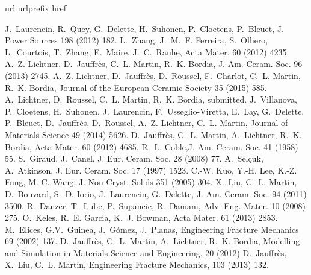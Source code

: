 \documentclass[preprint,12pt,3p]{elsarticle}
\begin{document}
%
\begin{thebibliography}{10}
\expandafter\ifx\csname url\endcsname\relax
  \def\url#1{\texttt{#1}}\fi
\expandafter\ifx\csname urlprefix\endcsname\relax\def\urlprefix{URL }\fi
\expandafter\ifx\csname href\endcsname\relax
  \def\href#1#2{#2} \def\path#1{#1}\fi

J.~Laurencin, R.~Quey, G.~Delette, H.~Suhonen, P.~Cloetens, P.~Bleuet, J. Power Sources
  198 (2012) 182.
L.~Zhang, J.~M.~F. Ferreira, S.~Olhero, L.~Courtois, T.~Zhang, E.~Maire,
  J.~C.~Rauhe,  Acta Mater. 60 (2012) 4235.
A.~Z. Lichtner, D.~Jauffr\`{e}s, C.~L. Martin, R.~K. Bordia, J. Am. Ceram. Soc. 96
  (2013) 2745.
A.~Z. Lichtner, D.~Jauffr\`{e}s, D.~Roussel, F.~Charlot, C.~L. Martin, R.~K.
  Bordia, Journal of the European Ceramic Society 35
  (2015) 585.
A.~Lichtner, D.~Roussel, C.~L. Martin, R.~K. Bordia,  submitted.
J.~Villanova, P.~Cloetens, H.~Suhonen, J.~Laurencin, F.~Usseglio-Viretta,
  E.~Lay, G.~Delette, P.~Bleuet, D.~Jauffr\`{e}s, D.~Roussel, A.~Z. Lichtner,
  C.~L. Martin, Journal of Materials Science 49 (2014) 5626.
D.~Jauffr\`{e}s, C.~L. Martin, A.~Lichtner, R.~K. Bordia,
  Acta Mater. 60 (2012) 4685.
R.~L. Coble,J. Am. Ceram. Soc. 41 (1958) 55.
S.~Giraud, J.~Canel, J. Eur. Ceram. Soc. 28 (2008) 77.
A.~Sel\c{c}uk, A.~Atkinson,  J. Eur. Ceram. Soc. 17 (1997) 1523.
C.-W. Kuo, Y.-H. Lee, K.-Z. Fung, M.-C. Wang, J. Non-Cryst. Solids 351 (2005) 304.
X.~Liu, C.~L. Martin, D.~Bouvard, S.~D. Iorio, J.~Laurencin, G.~Delette, J. Am. Ceram. Soc. 94 (2011) 3500.
R.~Danzer, T.~Lube, P.~Supancic, R.~Damani, Adv. Eng.  Mater. 10 (2008) 275.
O.~Keles, R.~E. Garcia, K.~J. Bowman, Acta Mater. 61 (2013) 2853.
M.~Elices, G.V.~Guinea, J.~Gómez, J.~Planas, Engineering Fracture Mechanics 69 (2002) 137.
D.~Jauffrès, C.~L. Martin, A.~Lichtner, R.~K. Bordia, Modelling and Simulation in Materials Science and Engineering, 20 (2012)
D.~Jauffrès, X.~Liu, C.~L. Martin, Engineering Fracture Mechanics, 103 (2013) 132.
\end{thebibliography}
\end{document}
